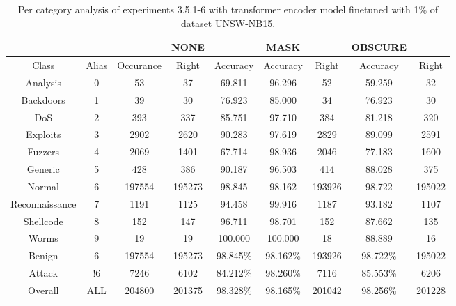 \begin{table}[htb]
    \centering
    \begin{tabular}{@{}ccccccccc@{}}
        \toprule
         &  &  & NONE &  & MASK &  & OBSCURE &  \\
        \midrule
        Class &  Alias &  Occurance &  Right &  Accuracy &  Accuracy &  Right &  Accuracy &  Right \\
        Analysis &  0 &  53 &  37 &  69.811 &  96.296 &  52 &  59.259 &  32 \\
        Backdoors &  1 &  39 &  30 &  76.923 &  85.000 &  34 &  76.923 &  30 \\
        DoS &  2 &  393 &  337 &  85.751 &  97.710 &  384 &  81.218 &  320 \\
        Exploits &  3 &  2902 &  2620 &  90.283 &  97.619 &  2829 &  89.099 &  2591 \\
        Fuzzers &  4 &  2069 &  1401 &  67.714 &  98.936 &  2046 &  77.183 &  1600 \\
        Generic &  5 &  428 &  386 &  90.187 &  96.503 &  414 &  88.028 &  375 \\
        Normal &  6 &  197554 &  195273 &  98.845 &  98.162 &  193926 &  98.722 &  195022 \\
        Reconnaissance &  7 &  1191 &  1125 &  94.458 &  99.916 &  1187 &  93.182 &  1107 \\
        Shellcode &  8 &  152 &  147 &  96.711 &  98.701 &  152 &  87.662 &  135 \\
        Worms &  9 &  19 &  19 &  100.000 &  100.000 &  18 &  88.889 &  16 \\
        Benign &  6 &  197554 &  195273 &  98.845\% &  98.162\% &  193926 &  98.722\% &  195022 \\
        Attack &  !6 &  7246 &  6102 &  84.212\% &  98.260\% &  7116 &  85.553\% &  6206 \\
        Overall &  ALL &  204800 &  201375 &  98.328\% &  98.165\% &  201042 &  98.256\% &  201228 \\
        \bottomrule
    \end{tabular}
    \caption{Per category analysis of experiments 3.5.1-6 with transformer encoder model finetuned with 1\% of dataset UNSW-NB15.}
    \label{table:results:lstm:class_flows15_10}
\end{table}